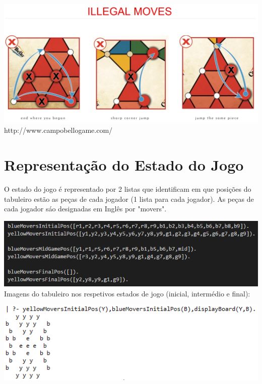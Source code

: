 \documentclass[a4paper]{article}
\begin{document}
\includegraphics[scale=0.3]{illegalMoves.PNG}\linebreak\linebreak
http://www.campobellogame.com/


\section{Representação do Estado do Jogo}


O estado do jogo é representado por 2 listas que identificam em que posições do tabuleiro estão as peças de cada jogador (1 lista para cada jogador). As peças de cada jogador sáo designadas em Inglês por "movers".\linebreak

\includegraphics[scale=0.7]{gameStates.PNG}\linebreak\linebreak
Imagens do tabuleiro nos respetivos estados de jogo (inicial, intermédio e final):\linebreak

\includegraphics[scale=1]{initialBoard.PNG}\linebreak\linebreak
\end{document}
